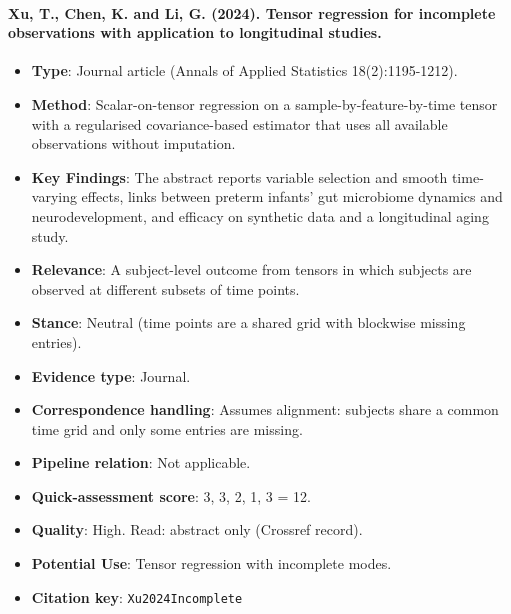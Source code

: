 \documentclass[journal,onecolumn]{IEEEtran}
\begin{document}
\paragraph{Xu, T., Chen, K. and Li, G. (2024). Tensor regression for incomplete observations with application to longitudinal studies.~\cite{Xu2024Incomplete}}\mbox{}

\begin{itemize}

\item{} \textbf{Type}: Journal article (Annals of Applied Statistics 18(2):1195-1212).

\item{} \textbf{Method}: Scalar-on-tensor regression on a sample-by-feature-by-time tensor with a regularised covariance-based estimator that uses all available observations without imputation.

\item{} \textbf{Key Findings}: The abstract reports variable selection and smooth time-varying effects, links between preterm infants' gut microbiome dynamics and neurodevelopment, and efficacy on synthetic data and a longitudinal aging study.

\item{} \textbf{Relevance}: A subject-level outcome from tensors in which subjects are observed at different subsets of time points.

\item{} \textbf{Stance}: Neutral (time points are a shared grid with blockwise missing entries).

\item{} \textbf{Evidence type}: Journal.

\item{} \textbf{Correspondence handling}: Assumes alignment: subjects share a common time grid and only some entries are missing.

\item{} \textbf{Pipeline relation}: Not applicable.

\item{} \textbf{Quick-assessment score}: 3, 3, 2, 1, 3 = 12.

\item{} \textbf{Quality}: High. Read: abstract only (Crossref record).

\item{} \textbf{Potential Use}: Tensor regression with incomplete modes.

\item{} \textbf{Citation key}: \texttt{Xu2024Incomplete}

\end{itemize}
\end{document}
